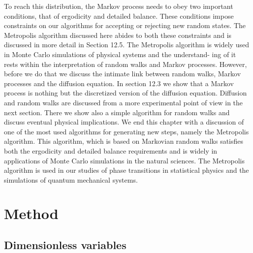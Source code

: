 \documentclass[12pt]{article}
\begin{document}
\begin{flushleft}
To reach this distribution, the Markov process needs to obey two important conditions, that of ergodicity and detailed balance. These conditions impose constraints on our algorithms for accepting or rejecting new random states. The Metropolis algorithm discussed here abides to both these constraints and is discussed in more detail in Section 12.5. The Metropolis algorithm is widely used in Monte Carlo simulations of physical systems and the understand- ing of it rests within the interpretation of random walks and Markov processes. However, before we do that we discuss the intimate link between random walks, Markov processes and the diffusion equation. In section 12.3 we show that a Markov process is nothing but the discretized version of the diffusion equation. Diffusion and random walks are discussed from a more experimental point of view in the next section. There we show also a simple algorithm for random walks and discuss eventual physical implications. We end this chapter with a discussion of one of the most used algorithms for generating new steps, namely the Metropolis algorithm. This algorithm, which is based on Markovian random walks satisfies both the ergodicity and detailed balance requirements and is widely in applications of Monte Carlo simulations in the natural sciences. The Metropolis algorithm is used in our studies of phase transitions in statistical physics and the simulations of quantum mechanical systems.











\newpage
\section{Method}
\subsection{Dimensionless variables}


\end{flushleft}
\end{document}
